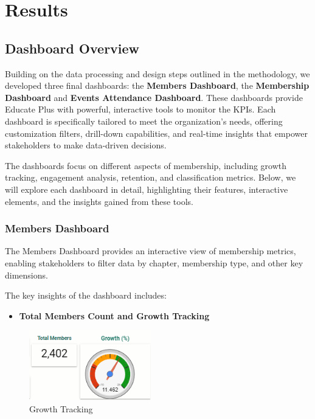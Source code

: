 \documentclass[11pt,a4paper,]{article}
\providecommand{\tightlist}{%
  \setlength{\itemsep}{0pt}\setlength{\parskip}{0pt}}
\begin{document}
\section{Results}\label{results}

\subsection{Dashboard Overview}\label{dashboard-overview}

Building on the data processing and design steps outlined in the methodology, we developed three final dashboards: the \textbf{Members Dashboard}, the \textbf{Membership Dashboard} and \textbf{Events Attendance Dashboard}. These dashboards provide Educate Plus with powerful, interactive tools to monitor the KPIs. Each dashboard is specifically tailored to meet the organization's needs, offering customization filters, drill-down capabilities, and real-time insights that empower stakeholders to make data-driven decisions.

The dashboards focus on different aspects of membership, including growth tracking, engagement analysis, retention, and classification metrics. Below, we will explore each dashboard in detail, highlighting their features, interactive elements, and the insights gained from these tools.

\subsubsection{Members Dashboard}\label{members-dashboard}

The Members Dashboard provides an interactive view of membership metrics, enabling stakeholders to filter data by chapter, membership type, and other key dimensions.

The key insights of the dashboard includes:

\begin{itemize}
\tightlist
\item
  \textbf{Total Members Count and Growth Tracking}
\end{itemize}

\begin{figure}[H]

{\centering \includegraphics[width=200px]{Images/total members_growth} 

}

\caption{Growth Tracking}\label{fig:insight-1}
\end{figure}
\end{document}
